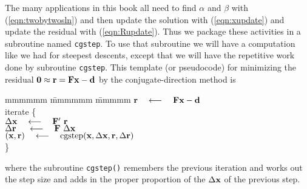 \par
The many applications in this book all need to
find $\alpha$ and $\beta$ with (\ref{eqn:twobytwosln}) and then
update the solution with (\ref{eqn:xupdate}) and
update the residual with (\ref{eqn:Rupdate}).
Thus we package these activities in a subroutine
named \texttt{cgstep}.
To use that subroutine we will have a computation 
like we had for steepest descents, except that we
will have the repetitive work done by subroutine {\tt cgstep}.
This template (or pseudocode) for minimizing the residual
$\bold 0\approx \bold r = \bold F \bold x - \bold d$
by the conjugate-direction method is
\label{lsq/'cgtemplate'}
\begin{tabbing}
mmmmmm \= mmmmmm \= mmmmm \kill
\> $\bold r \quad\longleftarrow\quad \bold F \bold x - \bold d$                \\
\> {\rm iterate \{ }                                                    \\
\>      \>  $\Delta \bold x   \quad\longleftarrow\quad \bold F'\         \bold r$      \\
\>      \>  $\Delta \bold r\  \quad\longleftarrow\quad \bold F \  \Delta \bold x$      \\
\>      \>  $(\bold x,\bold r) \quad\longleftarrow\quad {\rm cgstep}
             (\bold x,
	     \Delta\bold x,
	     \bold r,
	     \Delta\bold r )$
        \\
\>      \> \}                                           
\end{tabbing}
where
the subroutine {\tt cgstep()}
remembers the previous iteration and
works out the step size and adds in
the proper proportion of the $\Delta \bold x$ of
the previous step.


